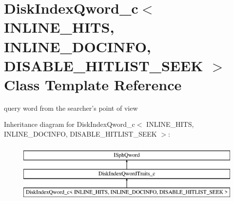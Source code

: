 \hypertarget{classDiskIndexQword__c}{\section{Disk\-Index\-Qword\-\_\-c$<$ I\-N\-L\-I\-N\-E\-\_\-\-H\-I\-T\-S, I\-N\-L\-I\-N\-E\-\_\-\-D\-O\-C\-I\-N\-F\-O, D\-I\-S\-A\-B\-L\-E\-\_\-\-H\-I\-T\-L\-I\-S\-T\-\_\-\-S\-E\-E\-K $>$ Class Template Reference}
\label{classDiskIndexQword__c}
}


query word from the searcher's point of view  


Inheritance diagram for Disk\-Index\-Qword\-\_\-c$<$ I\-N\-L\-I\-N\-E\-\_\-\-H\-I\-T\-S, I\-N\-L\-I\-N\-E\-\_\-\-D\-O\-C\-I\-N\-F\-O, D\-I\-S\-A\-B\-L\-E\-\_\-\-H\-I\-T\-L\-I\-S\-T\-\_\-\-S\-E\-E\-K $>$\-:\begin{figure}[H]
\begin{center}
\leavevmode
\includegraphics[height=3.000000cm]{classDiskIndexQword__c}
\end{center}
\end{figure}
